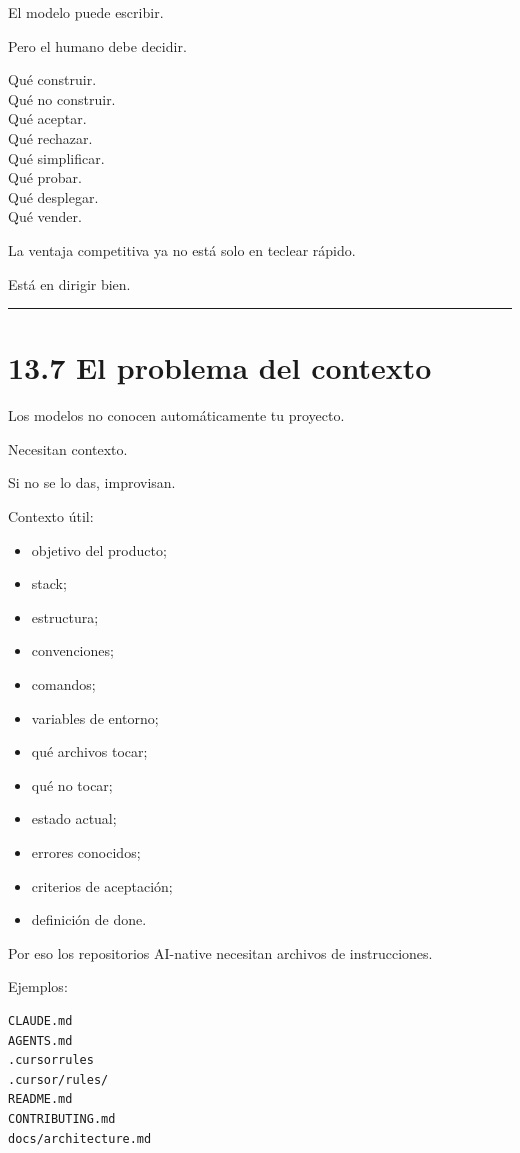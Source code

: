 El modelo puede escribir.

Pero el humano debe decidir.

Qué construir.\\
Qué no construir.\\
Qué aceptar.\\
Qué rechazar.\\
Qué simplificar.\\
Qué probar.\\
Qué desplegar.\\
Qué vender.

La ventaja competitiva ya no está solo en teclear rápido.

Está en dirigir bien.

\begin{center}\rule{0.5\linewidth}{0.5pt}\end{center}

\section{13.7 El problema del contexto}\label{el-problema-del-contexto}

Los modelos no conocen automáticamente tu proyecto.

Necesitan contexto.

Si no se lo das, improvisan.

Contexto útil:

\begin{itemize}
\tightlist
\item
  objetivo del producto;
\item
  stack;
\item
  estructura;
\item
  convenciones;
\item
  comandos;
\item
  variables de entorno;
\item
  qué archivos tocar;
\item
  qué no tocar;
\item
  estado actual;
\item
  errores conocidos;
\item
  criterios de aceptación;
\item
  definición de done.
\end{itemize}

Por eso los repositorios AI-native necesitan archivos de instrucciones.

Ejemplos:

\begin{lstlisting}
CLAUDE.md
AGENTS.md
.cursorrules
.cursor/rules/
README.md
CONTRIBUTING.md
docs/architecture.md
\end{lstlisting}

